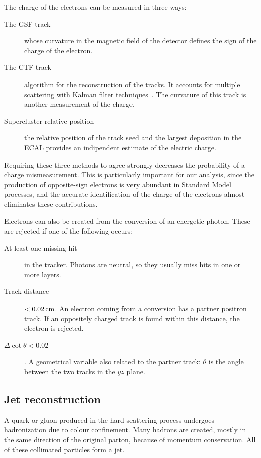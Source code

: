 The charge of the electrons can be measured in three ways:
\begin{description}
    \item[The GSF track] whose curvature in the magnetic field of the
        detector defines the sign of the charge of the electron.
    \item[The CTF track] algorithm for the reconstruction of the
        tracks. It accounts for multiple scattering with Kalman filter
        techniques~\cite{springerlink:10.1140/epjc/s10052-006-0175-5}. The
        curvature of this track is another measurement of the charge.
    \item[Supercluster relative position] the relative position of the track seed
        and the largest deposition in the ECAL provides an indipendent
        estimate of the electric charge.
\end{description}
Requiring these three methods to agree strongly decreases the probability of
a charge mismeasurement. This is particularly important for our analysis,
since the production of opposite-sign electrons is very abundant in Standard
Model processes, and the accurate identification of the charge of the
electrons almost eliminates these contributions.

Electrons can also be created from the conversion of an energetic photon.
These are rejected if one of the following occurs:
\begin{description}
    \item[At least one missing hit] in the tracker. Photons are neutral, so they
        usually miss hits in one or more layers.
    \item[Track distance] $< \unit[0.02]{cm}$. An electron coming from a
        conversion has a partner positron track. If an oppositely charged
        track is found within this distance, the electron is rejected.
    \item[$\Delta \cot \theta < 0.02$]. A geometrical variable also related
        to the partner track: $\theta$ is the angle between the two tracks
        in the $yz$ plane.
\end{description}

\subsection{Jet reconstruction}\label{sec:jet_reco}
A quark or gluon produced in the hard scattering process undergoes
hadronization due to colour confinement. Many hadrons are created, mostly in
the same direction of the original parton, because of momentum conservation.
All of these collimated particles form a jet.

